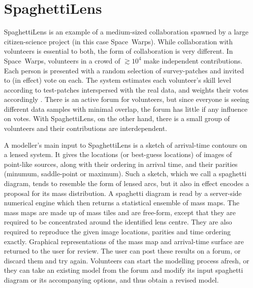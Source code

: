 \section{SpaghettiLens}\label{sec:spl}

SpaghettiLens is an example of a medium-sized collaboration spawned by
a large citizen-science project (in this case Space~Warps).  While
collaboration with volunteers is essential to both, the form of
collaboration is very different.  In Space~Warps, volunteers in a
crowd of $\gtrsim10^4$ make independent contributions.  Each person is
presented with a random selection of survey-patches and invited to (in
effect) vote on each.  The system estimates each volunteer's skill
level according to test-patches interspersed with the real data, and
weights their votes accordingly \citep{2016MNRAS.455.1171M}.  There is
an active forum for volunteers, but since everyone is seeing different
data samples with minimal overlap, the forum has little if any
influence on votes.  With SpaghettiLens, on the other hand, there is a
small group of volunteers and their contributions are interdependent.

A modeller's main input to SpaghettiLens is a sketch of arrival-time
contours on a lensed system.  It gives the locations (or best-guess
locations) of images of point-like sources, along with their ordering
in arrival time, and their parities (minumum, saddle-point or
maximum).  Such a sketch, which we call a spaghetti diagram, tends to
resemble the form of lensed arcs, but it also in effect 
encodes a proposal for its mass distribution.  A spaghetti diagram is
read by a server-side numerical engine \citep[GLASS, developed
  by][]{2014MNRAS.445.2181C} which then returns a statistical ensemble
of mass maps.  The mass maps are made up of mass tiles and are
free-form, except that they are required to be concentrated around the
identified lens centre.  They are also required to reproduce the given
image locations, parities and time ordering exactly.  Graphical
representations of the mass map and arrival-time surface are returned
to the user for review.  The user can post these results on a forum,
or discard them and try again.  Volunteers can start the modelling
process afresh, or they can take an existing model from the forum and
modify its input spaghetti diagram or its accompanying options, and
thus obtain a revised model.

